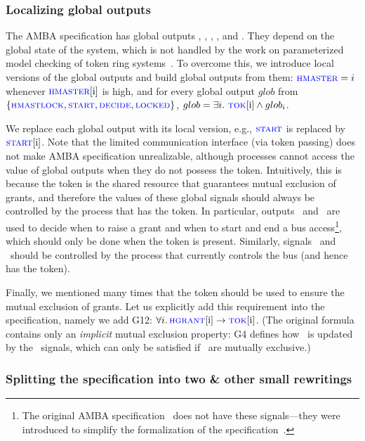 \subsubsection{Localizing global outputs}

  The AMBA specification has global outputs \hmastlock, \hmaster, \hstart, \hdecide, and \hlocked.
  They depend on the global state of the system,
  which is not handled by the work on parameterized model checking of token ring systems~\cite{Emerso03,AJKR14}.
  To overcome this,
  we introduce local versions of the global outputs and build global outputs from them:
  \li
  \- $\textsc{\textcolor{blue}{hmaster}} = i$ whenever $\textsc{\textcolor{blue}{hmaster}}[\textrm{i}]$ is high, and 
  \- for every global output $glob$ from $\{\textsc{\textcolor{blue}{hmastlock}}, \textsc{\textcolor{blue}{start}}, \textsc{\textcolor{blue}{decide}}, \textsc{\textcolor{blue}{locked}}\}$,
     $glob = \exists{i}.\ \textsc{\textcolor{blue}{tok}}[\textrm{i}] \land glob_i$.
  \il
    
  We replace each global output with its local version, e.g., $\textsc{\textcolor{blue}{start}}$ is replaced by $\textsc{\textcolor{blue}{start}}[\textrm{i}]$.
  Note that the limited communication interface (via token passing)
  does not make AMBA specification unrealizable,
  although processes cannot access the value of global outputs when they do not possess the token.
  Intuitively, this is because the token is the shared resource that guarantees mutual exclusion of grants, and therefore the values of these global signals should always be controlled by the process that has the token. In particular, outputs \hdecide\ and \hstart\ are used to decide when to raise a grant and when to start and end a bus access\footnote{The original AMBA specification~\cite{AMBAspec} does not have these signals---they were introduced to simplify the formalization of the specification~\cite{BarbaraThesis}.}, which should only be done when the token is present.
  Similarly, signals \hmastlock\ and \hmaster\ should be controlled by the process that currently controls the bus (and hence has the token). 

  Finally, we mentioned many times that the token should be used to ensure the mutual exclusion of grants.
  Let us explicitly add this requirement into the specification,
  namely we add G12: $\forall i.\,\textsc{\textcolor{blue}{hgrant}}[\textrm{i}] \rightarrow \textsc{\textcolor{blue}{tok}}[\textrm{i}]$.
  (The original formula contains only an \emph{implicit} mutual exclusion property:
   G4 defines how \hmaster\ is updated by the \hgranti\ signals,
   which can only be satisfied if \hgranti\ are mutually exclusive.)

\subsubsection{Splitting the specification into two \& other small rewritings}

